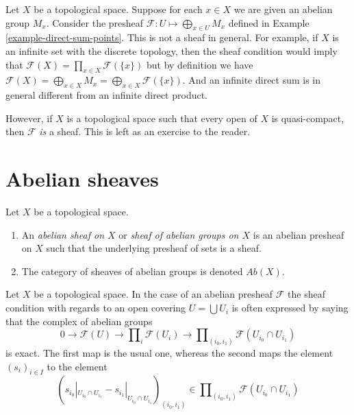 \begin{example}
\label{example-direct-sum-points-not-sheaf}
Let $X$ be a topological space.
Suppose for each $x\in X$ we are given an abelian group $M_x$.
Consider the presheaf $\mathcal{F} : U \mapsto \bigoplus_{x \in U} M_x$
defined in Example \ref{example-direct-sum-points}. This
is not a sheaf in general. For example, if $X$ is an infinite set
with the discrete topology, then the sheaf condition
would imply that $\mathcal{F}(X) = \prod_{x\in X} \mathcal{F}(\{x\})$
but by definition we have $\mathcal{F}(X)
= \bigoplus_{x \in X} M_x = \bigoplus_{x \in X} \mathcal{F}(\{x\})$.
And an infinite direct sum is in general different from an infinite
direct product.

\medskip\noindent
However, if $X$ is a topological space such that every open
of $X$ is quasi-compact, then $\mathcal{F}$ {\it is} a sheaf.
This is left as an exercise to the reader.
\end{example}



\section{Abelian sheaves}
\label{section-abelian-sheaves}

\begin{definition}
\label{definition-abelian-sheaf}
Let $X$ be a topological space.
\begin{enumerate}
\item An {\it abelian sheaf on $X$} or
{\it sheaf of abelian groups on $X$}
is an abelian presheaf on $X$ such that the underlying presheaf of
sets is a sheaf.
\item The category of sheaves of abelian groups
is denoted $\textit{Ab}(X)$.
\end{enumerate}
\end{definition}

\noindent
Let $X$ be a topological space.
In the case of an abelian presheaf $\mathcal{F}$ the sheaf
condition with regards to an open covering $U = \bigcup U_i$
is often expressed by saying that the complex of abelian groups
$$
0 \to \mathcal{F}(U)
\to \prod\nolimits_i \mathcal{F}(U_i)
\to \prod\nolimits_{(i_0, i_1)} \mathcal{F}(U_{i_0} \cap U_{i_1})
$$
is exact. The first map is the usual one, whereas the second
maps the element $(s_i)_{i \in I}$ to the element
$$
(
s_{i_0}|_{U_{i_0} \cap U_{i_1}} -
s_{i_1}|_{U_{i_0} \cap U_{i_1}}
)_{(i_0, i_1)}
\in \prod\nolimits_{(i_0, i_1)} \mathcal{F}(U_{i_0} \cap U_{i_1})
$$

